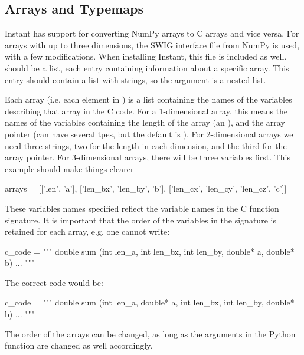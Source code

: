 \subsection{Arrays and Typemaps}\label{arrays}
Instant has support for converting NumPy arrays to C arrays and vice
versa. For arrays with up to three dimensions, the SWIG interface file from
NumPy is used, with a few modifications. When installing Instant, this file is
included as well.  should be a list, each entry containing
information about a specific array. This entry should contain a list with
strings, so the  argument is a nested list.

Each array (i.e. each element in ) is a list containing the names
of the variables describing that array in the C code. For a 1-dimensional
array, this means the names of the variables containing the length of the
array (an ), and the array pointer (can have several tpes, but the
default is ). For 2-dimensional arrays we need three strings, two
for the length in each dimension, and the third for the array pointer. For
3-dimensional arrays, there will be three variables first. This example should
make things clearer
\begin{code}
arrays = [['len', 'a'],
          ['len_bx', 'len_by', 'b'],
          ['len_cx', 'len_cy', 'len_cz', 'c']]
\end{code}
These variables names specified reflect the variable names in the C function
signature. It is important that the order of the variables in the signature is
retained for each array, e.g. one cannot write:
\begin{code}
c_code = """
double sum (int len_a, int len_bx, int len_by,
            double* a, double* b)
{
  ...
}
"""
\end{code}
The correct code would be:
\begin{code}
c_code = """
double sum (int len_a, double* a,
            int len_bx,
            int len_by, double* b)
{
  ...
}
"""
\end{code}
The order of the arrays can be changed, as long as the arguments in the Python
function are changed as well accordingly.

